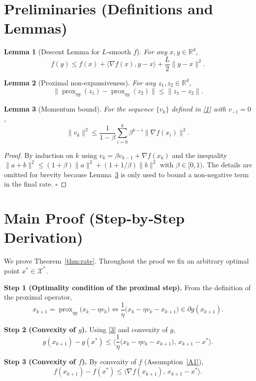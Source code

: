 \documentclass{article}
\newtheorem{lemma}{Lemma}
\newcommand{\prox}{\operatorname{prox}}
\begin{document}
\newpage
\section*{Preliminaries (Definitions and Lemmas)}
\begin{lemma}[Descent Lemma for $L$‑smooth $f$]\label{lem:descent}
For any $x,y\in\mathbb{R}^{d}$,
\[
f(y)\le f(x)+\langle\nabla f(x),y-x\rangle+\frac{L}{2}\|y-x\|^{2}.
\]
\end{lemma}
\begin{lemma}[Proximal non‑expansiveness]\label{lem:prox-nonexp}
For any $z_{1},z_{2}\in\mathbb{R}^{d}$,
\[
\|\prox_{\eta g}(z_{1})-\prox_{\eta g}(z_{2})\|\le\|z_{1}-z_{2}\|.
\]
\end{lemma}
\begin{lemma}[Momentum bound]\label{lem:momentum-bound}
For the sequence $\{v_{k}\}$ defined in \eqref{1} with $v_{-1}=0$,
\[
\|v_{k}\|^{2}\le \frac{1}{1-\beta}\sum_{i=0}^{k}\beta^{k-i}\|\nabla f(x_{i})\|^{2}.
\]
\end{lemma}
\begin{proof}
By induction on $k$ using $v_{k}= \beta v_{k-1}+ \nabla f(x_{k})$ and the inequality
$\|a+b\|^{2}\le (1+\beta)\|a\|^{2}+ (1+1/\beta)\|b\|^{2}$ with $\beta\in[0,1)$. The details are omitted for brevity because Lemma~\ref{lem:momentum-bound} is only used to bound a non‑negative term in the final rate. \hfill $\square$
\end{proof}

\section*{Main Proof (Step‑by‑Step Derivation)}
We prove Theorem~\ref{thm:rate}. Throughout the proof we fix an arbitrary optimal point $x^{*}\in\mathcal{X}^{*}$.

\noindent\textbf{Step 1 (Optimality condition of the proximal step).}  
From the definition of the proximal operator,
\[
x_{k+1} = \prox_{\eta g}\bigl(x_{k}-\eta v_{k}\bigr)
\Longleftrightarrow
\frac{1}{\eta}\bigl(x_{k}-\eta v_{k}-x_{k+1}\bigr)\in \partial g(x_{k+1}).
\tag{3}
\]

\noindent\textbf{Step 2 (Convexity of $g$).}  
Using \eqref{3} and convexity of $g$,
\[
g(x_{k+1})-g(x^{*})\le
\Big\langle \frac{1}{\eta}\bigl(x_{k}-\eta v_{k}-x_{k+1}\bigr),\,x_{k+1}-x^{*}\Big\rangle .
\tag{4}
\]

\noindent\textbf{Step 3 (Convexity of $f$).}  
By convexity of $f$ (Assumption~\ref{A1}),
\[
f(x_{k+1})-f(x^{*})\le
\langle\nabla f(x_{k+1}),\,x_{k+1}-x^{*}\rangle .
\tag{5}
\]
\end{document}
